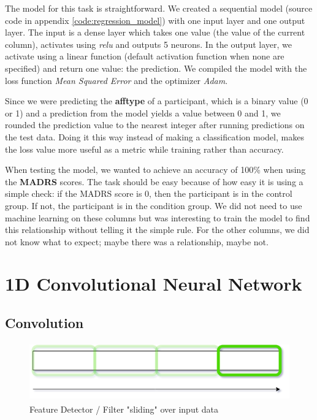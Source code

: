 The model for this task is straightforward. We created a sequential model (source code in appendix \ref{code:regression_model}) with one input layer and one output layer. The input is a dense layer which takes one value (the value of the current column), activates using \textit{relu} and outputs 5 neurons. In the output layer, we activate using a linear function (default activation function when none are specified) and return one value: the prediction. We compiled the model with the loss function \textit{Mean Squared Error} and the optimizer \textit{Adam}. 

Since we were predicting the \textbf{afftype} of a participant, which is a binary value (0 or 1) and a prediction from the model yields a value between 0 and 1, we rounded the prediction value to the nearest integer after running predictions on the test data. Doing it this way instead of making a classification model, makes the loss value more useful as a metric while training rather than accuracy. 

When testing the model, we wanted to achieve an accuracy of 100\% when using the \textbf{MADRS} scores. The task should be easy because of how easy it is using a simple check: if the MADRS score is 0, then the participant is in the control group. If not, the participant is in the condition group. We did not need to use machine learning on these columns but was interesting to train the model to find this relationship without telling it the simple rule. For the other columns, we did not know what to expect; maybe there was a relationship, maybe not.

\section{1D Convolutional Neural Network}

\subsection{Convolution}

\begin{figure}[h]
\begin{center}
    \includegraphics[height=2.5cm]{img/feature_detector.png}
    \caption{Feature Detector / Filter "sliding" over input data}
    \label{figure:feature_detector}
\end{center}
\end{figure}

